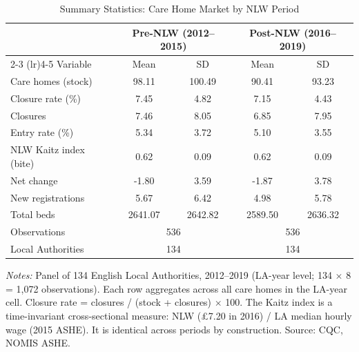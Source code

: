 \begin{table}[htbp]
\centering
\begin{threeparttable}
\caption{Summary Statistics: Care Home Market by NLW Period}
\label{tab:summary}
\begin{tabular}{lcccc}
\toprule
 & \multicolumn{2}{c}{Pre-NLW (2012--2015)} & \multicolumn{2}{c}{Post-NLW (2016--2019)} \\
\cmidrule(lr){2-3} \cmidrule(lr){4-5}
Variable & Mean & SD & Mean & SD \\
\midrule
Care homes (stock) & 98.11 & 100.49 & 90.41 & 93.23 \\
Closure rate (\%) & 7.45 & 4.82 & 7.15 & 4.43 \\
Closures & 7.46 & 8.05 & 6.85 & 7.95 \\
Entry rate (\%) & 5.34 & 3.72 & 5.10 & 3.55 \\
NLW Kaitz index (bite) & 0.62 & 0.09 & 0.62 & 0.09 \\
Net change & -1.80 & 3.59 & -1.87 & 3.78 \\
New registrations & 5.67 & 6.42 & 4.98 & 5.78 \\
Total beds & 2641.07 & 2642.82 & 2589.50 & 2636.32 \\
\midrule
Observations & \multicolumn{2}{c}{536} & \multicolumn{2}{c}{536} \\
Local Authorities & \multicolumn{2}{c}{134} & \multicolumn{2}{c}{134} \\
\bottomrule
\end{tabular}
\begin{tablenotes}
\small
\item \textit{Notes:} Panel of 134 English Local Authorities, 2012--2019 (LA-year level; 134 $\times$ 8 = 1,072 observations). Each row aggregates across all care homes in the LA-year cell. Closure rate = closures / (stock + closures) $\times$ 100. The Kaitz index is a time-invariant cross-sectional measure: NLW (\pounds7.20 in 2016) / LA median hourly wage (2015 ASHE). It is identical across periods by construction. Source: CQC, NOMIS ASHE.
\end{tablenotes}
\end{threeparttable}
\end{table}
